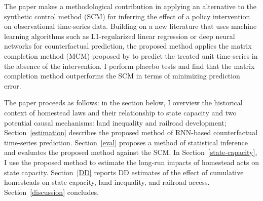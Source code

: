 \documentclass[12pt]{article}
\begin{document}


The paper makes a methodological contribution in applying an alternative to the synthetic control method (SCM) \citep{abadie2010synthetic} for inferring the effect of a policy intervention on observational time-series data. Building on a new literature that uses machine learning algorithms such as L1-regularized linear regression \citep{doudchenko2016balancing} or deep neural networks \citep{2017arXiv171203553P} for counterfactual prediction, the proposed method applies the matrix completion method (MCM) proposed by \citet{athey2017matrix} to predict the treated unit time-series in the absence of the intervention. I perform placebo tests and find that the matrix completion method outperforms the SCM in terms of minimizing prediction error. 

The paper proceeds as follows: in the section below, I overview the historical context of homestead laws and their relationship to state capacity and two potential causal mechanisms: land inequality and railroad development; Section~\ref{estimation} describes the proposed method of RNN-based counterfactual time-series prediction. Section~\ref{eval} proposes a method of statistical inference and evaluates the proposed method against the SCM. In Section~\ref{state-capacity}, I use the proposed method to estimate the long-run impacts of homestead acts on state capacity. Section~\ref{DD} reports DD estimates of the effect of cumulative homesteads on state capacity, land inequality, and railroad access. Section~\ref{discussion} concludes. 
\end{document}

